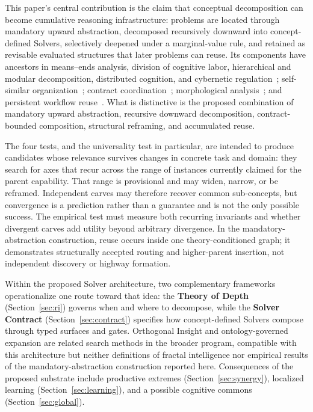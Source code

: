 \documentclass[11pt]{article}
\begin{document}
This paper's central contribution is the claim that conceptual decomposition can become cumulative reasoning infrastructure: problems are located through mandatory upward abstraction, decomposed recursively downward into concept-defined Solvers, selectively deepened under a marginal-value rule, and retained as revisable evaluated structures that later problems can reuse. Its components have ancestors in means--ends analysis, division of cognitive labor, hierarchical and modular decomposition, distributed cognition, and cybernetic regulation~\cite{newell1972,babbage1832,simon1962,minsky1986,parnas1972,ashby1956}; self-similar organization~\cite{hewitt1973actor,Warnecke1993,Ryu2003}; contract coordination~\cite{Smith1980,khattab2024dspy,zhuge2024gptswarm,YeTan2026agentcontracts}; morphological analysis~\cite{zwicky1969}; and persistent workflow reuse~\cite{singh2025graphmemoized}. What is distinctive is the proposed combination of mandatory upward abstraction, recursive downward decomposition, contract-bounded composition, structural reframing, and accumulated reuse.

The four tests, and the universality test in particular, are intended to produce candidates whose relevance survives changes in concrete task and domain: they search for axes that recur across the range of instances currently claimed for the parent capability. That range is provisional and may widen, narrow, or be reframed. Independent carves may therefore recover common sub-concepts, but convergence is a prediction rather than a guarantee and is not the only possible success. The empirical test must measure both recurring invariants and whether divergent carves add utility beyond arbitrary divergence. In the mandatory-abstraction construction, reuse occurs inside one theory-conditioned graph; it demonstrates structurally accepted routing and higher-parent insertion, not independent discovery or highway formation.

Within the proposed Solver architecture, two complementary frameworks operationalize one route toward that idea: the \textbf{Theory of Depth} (Section~\ref{sec:ri}) governs when and where to decompose, while the \textbf{Solver Contract} (Section~\ref{sec:contract}) specifies how concept-defined Solvers compose through typed surfaces and gates. Orthogonal Insight and ontology-governed expansion are related search methods in the broader program, compatible with this architecture but neither definitions of fractal intelligence nor empirical results of the mandatory-abstraction construction reported here. Consequences of the proposed substrate include productive extremes (Section~\ref{sec:synergy}), localized learning (Section~\ref{sec:learning}), and a possible cognitive commons (Section~\ref{sec:global}).
\end{document}
